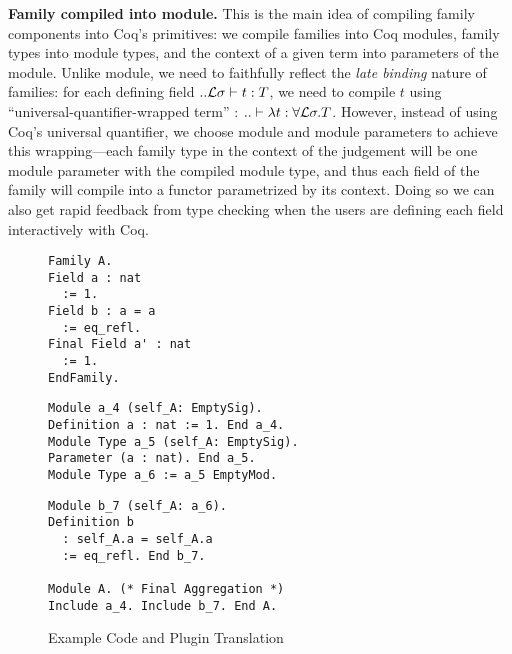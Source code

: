 \textbf{Family compiled into module.} This is the main idea of compiling
family components into Coq's primitives: we compile families into Coq
modules, family types into module types, and the context of a given term
into parameters of the module. Unlike module, we need to faithfully
reflect the \textit{late binding} nature of families: for each defining
field $ .. {\mathcal{L}}\sigma \vdash t : T $, we need to compile $t$ using
``universal-quantifier-wrapped term'' : $.. \vdash \lambda t : \forall
{\mathcal{L}} \sigma. T$. However, instead of using Coq's universal quantifier, we
choose module and module parameters to achieve this wrapping---each
family type in the context of the judgement will be one module parameter
with the compiled module type, and thus each field of the family will
compile into a functor parametrized by its context. Doing so we can also
get rapid feedback from type checking when the users are defining each
field interactively with Coq.
\begin{figure}[!htb]
  \begin{minipage}[t]{0.25\linewidth}
\begin{verbatim}
Family A.
Field a : nat 
  := 1.
Field b : a = a
  := eq_refl.
Final Field a' : nat 
  := 1. 
EndFamily.
\end{verbatim}
  \end{minipage}%
  \begin{minipage}[t]{0.4\linewidth}
\begin{verbatim}
Module a_4 (self_A: EmptySig).
Definition a : nat := 1. End a_4.
Module Type a_5 (self_A: EmptySig).
Parameter (a : nat). End a_5.
Module Type a_6 := a_5 EmptyMod.
\end{verbatim}
  \end{minipage}
  \begin{minipage}[t]{0.3\linewidth}
\begin{verbatim}
Module b_7 (self_A: a_6).
Definition b 
  : self_A.a = self_A.a 
  := eq_refl. End b_7.
  
Module A. (* Final Aggregation *)
Include a_4. Include b_7. End A.
\end{verbatim}
  \end{minipage}
  \caption{Example Code and Plugin Translation}\label{fig:plugin-example1}
\end{figure}


